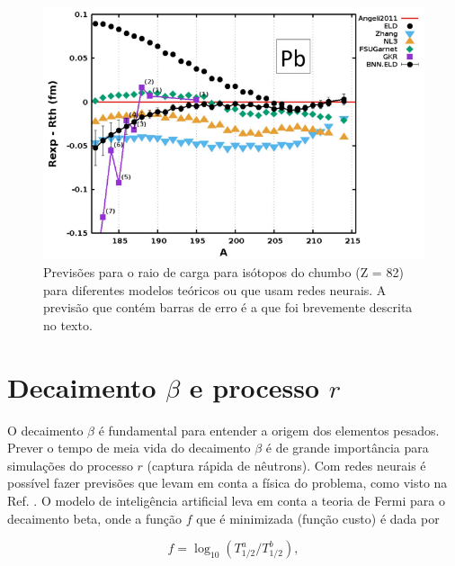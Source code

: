 \documentclass[a4paper,12pt,oneside]{book}
\begin{document}
\begin{appendices}
\begin{figure}[H]
    \centering
    \includegraphics[scale = 0.60]{figs/radii.png}
    \caption{Previsões para o raio de carga para isótopos do chumbo (Z = 82) para diferentes modelos teóricos ou que usam redes neurais. A previsão que contém barras de erro é a que foi brevemente descrita no texto.}
    \label{fig:radii}
\end{figure}


\section{Decaimento $\beta$ e processo $r$}

\par O decaimento $\beta$ é fundamental para entender a origem dos elementos pesados. Prever o tempo de meia vida do decaimento $\beta$ é de grande importância para simulações do processo $r$ (captura rápida de nêutrons). Com redes neurais é possível fazer previsões que levam em conta a física do problema, como visto na Ref. \cite{mlbetadecay}. O modelo de inteligência artificial leva em conta a teoria de Fermi para o decaimento beta, onde a função $f$ que é minimizada (função custo) é dada por

\begin{equation}\label{eq:half_life}
    f = \log_{10}(T^{a}_{1/2}/T^{b}_{1/2}),
\end{equation}


\end{appendices}
\end{document}
